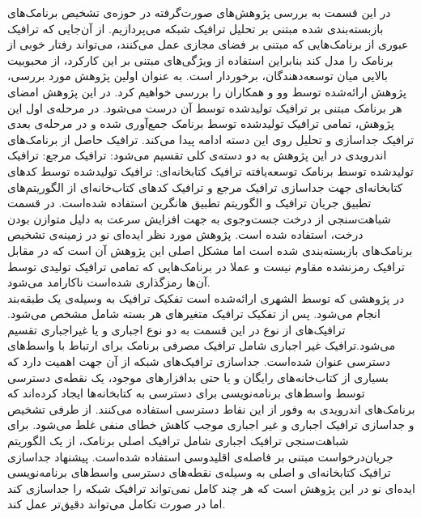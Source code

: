 در این قسمت به بررسی پژوهش‌های صورت‌گرفته در حوزه‌ی تشخیص برنامک‌های بازبسته‌بندی شده مبتنی بر تحلیل ترافیک شبکه‌ می‌پردازیم. از آن‌جایی که ترافیک عبوری از برنامک‌هایی که مبتنی بر فضای مجازی عمل می‌کنند، می‌تواند رفتار خوبی از برنامک را مدل کند بنابراین استفاده از ویژگی‌های مبتنی بر این کارکرد، از محبوبیت بالایی میان توسعه‌دهندگان، برخوردار است. به عنوان اولین پژوهش مورد بررسی، پژوهش ارائه‌شده توسط وو و همکاران را بررسی خواهیم کرد. در این پژوهش امضا‌ی هر برنامک مبتنی بر ترافیک  تولیدشده توسط آن درست می‌شود. در مرحله‌ی اول این پژوهش، تمامی ترافیک‌ تولید‌شده توسط برنامک جمع‌آوری شده و در مرحله‌ی بعدی ترافیک  جداسازی و تحلیل روی این دسته ادامه پیدا می‌کند. ترافیک حاصل از برنامک‌های اندرویدی در این پژوهش به دو دسته‌ی کلی تقسیم می‌شود:
 ترافیک مرجع‌: ترافیک تولید‌شده توسط برنامک توسعه‌یافته
 ترافیک کتابخانه‌ای: ترافیک تولید‌شده توسط کد‌های کتابخانه‌ای
جهت جداسازی ترافیک مرجع و ترافیک کد‌های کتاب‌خانه‌ای از الگوریتم‌های تطبیق جریان ترافیک‌  و الگوریتم تطبیق هانگرین‌ استفاده شده‌است. در قسمت شباهت‌سنجی از درخت جست‌وجوی  به جهت افزایش سرعت به دلیل متوازن بودن درخت، استفاده شده ‌است. پژوهش مورد نظر ایده‌ای نو در زمینه‌ی تشخیص برنامک‌های بازبسته‌بندی شده است اما مشکل اصلی این پژوهش آن است که در مقابل ترافیک رمز‌نشده مقاوم نیست و عملا در برنامک‌هایی که تمامی ترافیک تولیدی توسط آن‌ها رمزگذاری شده‌است ناکارامد می‌شود.
\\
در پژوهشی که توسط الشهری ارائه‌شده است تفکیک ترافیک به وسیله‌ی یک طبقه‌بند انجام می‌‌شود. پس از تفکیک ترافیک متغیر‌های هر بسته شامل  مشخص‌ می‌شود. ترافیک‌های از نوع  در این قسمت به دو نوع اجباری و یا غیراجباری تقسیم می‌شود.ترافیک غیر اجباری شامل ترافیک مصرفی برنامک برای ارتباط با واسط‌های دسترسی عنوان شده‌است. جداسازی ترافیک‌های شبکه از آن‌ جهت اهمیت دارد که بسیاری از کتاب‌خانه‌های رایگان و یا حتی بدافزار‌های موجود، یک نقطه‌ی دسترسی‌ توسط واسط‌های برنامه‌نویسی برای دسترسی به کتابخانه‌ها ایجاد کرده‌اند که برنامک‌های اندرویدی به وفور از این نفاط دسترسی استفاده می‌کنند. از طرفی تشخیص و جداسازی ترافیک اجباری و غیر اجباری موجب کاهش خطای منفی غلط می‌شود. برای شباهت‌سنجی ترافیک اجباری شامل ترافیک اصلی برنامک، از یک الگوریتم جریان‌درخواست‌ مبتنی بر فاصله‌ی اقلیدوسی‌ استفاده شده‌است. پیشنهاد جداسازی ترافیک کتابخانه‌ای و اصلی به وسیله‌ی نقطه‌های دسترسی واسط‌های برنامه‌نویسی ایده‌ای نو در این پژوهش است که هر چند کامل نمی‌تواند ترافیک‌ شبکه را جداسازی کند اما در صورت تکامل می‌تواند دقیق‌تر عمل کند.

